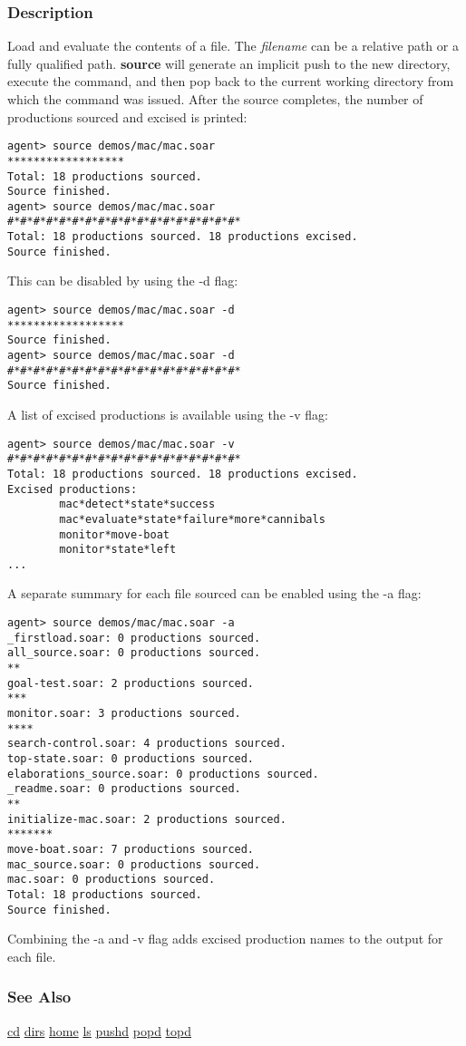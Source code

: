 \subsubsection*{Description}
 Load and evaluate the contents of a file. The \emph{filename}
 can be a relative path or a fully qualified path. \textbf{source}
 will generate an implicit push to the new directory, execute the command, and then pop back to the current working directory from which the command was issued. 
 After the source completes, the number of productions sourced and excised is printed: \begin{verbatim}
agent> source demos/mac/mac.soar
******************
Total: 18 productions sourced.
Source finished.
agent> source demos/mac/mac.soar
#*#*#*#*#*#*#*#*#*#*#*#*#*#*#*#*#*#*
Total: 18 productions sourced. 18 productions excised.
Source finished.
\end{verbatim}
 This can be disabled by using the -d flag: \begin{verbatim}
agent> source demos/mac/mac.soar -d
******************
Source finished.
agent> source demos/mac/mac.soar -d
#*#*#*#*#*#*#*#*#*#*#*#*#*#*#*#*#*#*
Source finished.
\end{verbatim}
 A list of excised productions is available using the -v flag: \begin{verbatim}
agent> source demos/mac/mac.soar -v
#*#*#*#*#*#*#*#*#*#*#*#*#*#*#*#*#*#*
Total: 18 productions sourced. 18 productions excised.
Excised productions:
        mac*detect*state*success
        mac*evaluate*state*failure*more*cannibals
        monitor*move-boat
        monitor*state*left
...
\end{verbatim}
 A separate summary for each file sourced can be enabled using the -a flag: \begin{verbatim}
agent> source demos/mac/mac.soar -a
_firstload.soar: 0 productions sourced.
all_source.soar: 0 productions sourced.
**
goal-test.soar: 2 productions sourced.
***
monitor.soar: 3 productions sourced.
****
search-control.soar: 4 productions sourced.
top-state.soar: 0 productions sourced.
elaborations_source.soar: 0 productions sourced.
_readme.soar: 0 productions sourced.
**
initialize-mac.soar: 2 productions sourced.
*******
move-boat.soar: 7 productions sourced.
mac_source.soar: 0 productions sourced.
mac.soar: 0 productions sourced.
Total: 18 productions sourced.
Source finished.
\end{verbatim}
 Combining the -a and -v flag adds excised production names to the output for each file. 
\subsubsection*{See Also}
\hyperref[cd]{cd} \hyperref[dirs]{dirs} \hyperref[home]{home} \hyperref[ls]{ls} \hyperref[pushd]{pushd} \hyperref[popd]{popd} \hyperref[topd]{topd} 
